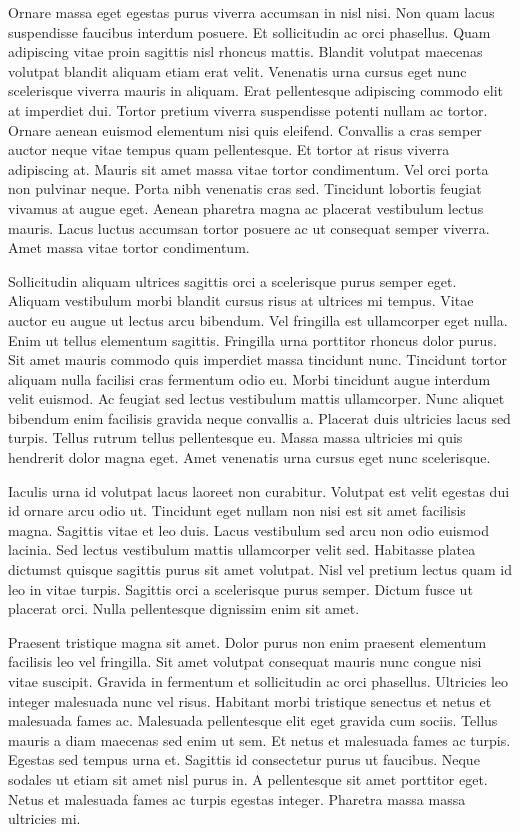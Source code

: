 \documentclass[11pt]{isr} %
\begin{document}
Ornare massa eget egestas purus viverra accumsan in nisl nisi. Non quam lacus suspendisse faucibus interdum posuere. Et sollicitudin ac orci phasellus. Quam adipiscing vitae proin sagittis nisl rhoncus mattis. Blandit volutpat maecenas volutpat blandit aliquam etiam erat velit. Venenatis urna cursus eget nunc scelerisque viverra mauris in aliquam. Erat pellentesque adipiscing commodo elit at imperdiet dui. Tortor pretium viverra suspendisse potenti nullam ac tortor. Ornare aenean euismod elementum nisi quis eleifend. Convallis a cras semper auctor neque vitae tempus quam pellentesque. Et tortor at risus viverra adipiscing at. Mauris sit amet massa vitae tortor condimentum. Vel orci porta non pulvinar neque. Porta nibh venenatis cras sed. Tincidunt lobortis feugiat vivamus at augue eget. Aenean pharetra magna ac placerat vestibulum lectus mauris. Lacus luctus accumsan tortor posuere ac ut consequat semper viverra. Amet massa vitae tortor condimentum.

Sollicitudin aliquam ultrices sagittis orci a scelerisque purus semper eget. Aliquam vestibulum morbi blandit cursus risus at ultrices mi tempus. Vitae auctor eu augue ut lectus arcu bibendum. Vel fringilla est ullamcorper eget nulla. Enim ut tellus elementum sagittis. Fringilla urna porttitor rhoncus dolor purus. Sit amet mauris commodo quis imperdiet massa tincidunt nunc. Tincidunt tortor aliquam nulla facilisi cras fermentum odio eu. Morbi tincidunt augue interdum velit euismod. Ac feugiat sed lectus vestibulum mattis ullamcorper. Nunc aliquet bibendum enim facilisis gravida neque convallis a. Placerat duis ultricies lacus sed turpis. Tellus rutrum tellus pellentesque eu. Massa massa ultricies mi quis hendrerit dolor magna eget. Amet venenatis urna cursus eget nunc scelerisque.

Iaculis urna id volutpat lacus laoreet non curabitur. Volutpat est velit egestas dui id ornare arcu odio ut. Tincidunt eget nullam non nisi est sit amet facilisis magna. Sagittis vitae et leo duis. Lacus vestibulum sed arcu non odio euismod lacinia. Sed lectus vestibulum mattis ullamcorper velit sed. Habitasse platea dictumst quisque sagittis purus sit amet volutpat. Nisl vel pretium lectus quam id leo in vitae turpis. Sagittis orci a scelerisque purus semper. Dictum fusce ut placerat orci. Nulla pellentesque dignissim enim sit amet.

Praesent tristique magna sit amet. Dolor purus non enim praesent elementum facilisis leo vel fringilla. Sit amet volutpat consequat mauris nunc congue nisi vitae suscipit. Gravida in fermentum et sollicitudin ac orci phasellus. Ultricies leo integer malesuada nunc vel risus. Habitant morbi tristique senectus et netus et malesuada fames ac. Malesuada pellentesque elit eget gravida cum sociis. Tellus mauris a diam maecenas sed enim ut sem. Et netus et malesuada fames ac turpis. Egestas sed tempus urna et. Sagittis id consectetur purus ut faucibus. Neque sodales ut etiam sit amet nisl purus in. A pellentesque sit amet porttitor eget. Netus et malesuada fames ac turpis egestas integer. Pharetra massa massa ultricies mi.
\end{document}
